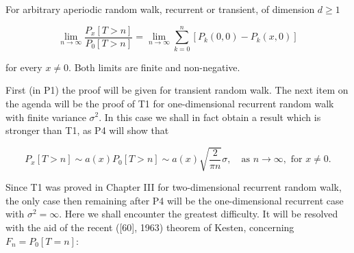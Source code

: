 For arbitrary aperiodic random walk, recurrent or transient, of dimension $d \geq 1$

$$\lim_{n \to \infty} \frac{P_x[T > n]}{P_0[T > n]} = \lim_{n \to \infty} \sum_{k=0}^{n} [P_k(0,0) - P_k(x,0)]$$

for every $x \neq 0$. Both limits are finite and non-negative.

First (in P1) the proof will be given for transient random walk. The next item on the agenda will be the proof of T1 for one-dimensional recurrent random walk with finite variance $\sigma^2$. In this case we shall in fact obtain a result which is stronger than T1, as P4 will show that

$$P_x[T > n] \sim a(x)P_0[T > n] \sim a(x)\sqrt{\frac{2}{\pi n}} \sigma, \quad \text{as } n \to \infty, \text{ for } x \neq 0.$$

Since T1 was proved in Chapter III for two-dimensional recurrent random walk, the only case then remaining after P4 will be the one-dimensional recurrent case with $\sigma^2 = \infty$. Here we shall encounter the greatest difficulty. It will be resolved with the aid of the recent ([60], 1963) theorem of Kesten, concerning $F_n = P_0[T = n]$: